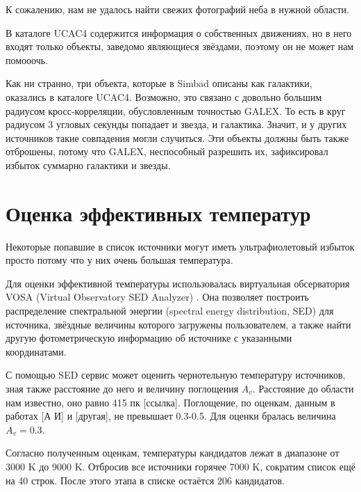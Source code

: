 К сожалению, нам не удалось найти свежих фотографий неба в нужной области. 

В каталоге UCAC4 содержится информация о собственных движениях, но в него входят только объекты, заведомо являющиеся звёздами, поэтому он не может нам помооочь.

Как ни странно, три объекта, которые в Simbad описаны как галактики, оказались в каталоге UCAC4. Возможно, это связано с довольно большим радиусом кросс-корреляции, обусловленным точностью GALEX. То есть в круг радиусом 3 угловых секунды попадает и звезда, и галактика. Значит, и у других источников такие совпадения могли случиться. Эти объекты должны быть также отброшены, потому что GALEX, неспособный разрешить их, зафиксировал избыток суммарно галактики и звезды.

\section{Оценка эффективных температур}
Некоторые попавшие в список источники могут иметь ультрафиолетовый избыток просто потому что у них очень большая температура. 

Для оценки эффективной температуры использовалась виртуальная обсерватория VOSA (Virtual Observatory SED Analyzer) \cite{bayo2008vosa}. Она позволяет построить распределение спектральной энергии (spectral energy distribution, SED) для источника, звёздные величины которого загружены пользователем, а также найти другую фотометрическую информацию об источнике с указанными координатами.

С помощью SED сервис может оценить чернотельную температуру источников, зная также расстояние до него и величину поглощения $A_v$. Расстояние до области нам известно, оно равно 415 пк [ссылка]. Поглощение, по оценкам, данным в работах [А И] и [другая], не превышает 0.3-0.5. Для оценки бралась величина $A_v=0.3$.

Согласно полученным оценкам, температуры кандидатов лежат в диапазоне от 3000 K до 9000 K. Отбросив все источники горячее 7000 K, сократим список ещё на 40 строк. После этого этапа в списке остаётся 206 кандидатов.


